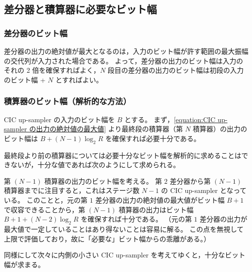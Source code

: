     \subsection{差分器と積算器に必要なビット幅}
        \subsubsection{差分器のビット幅}
            差分器の出力の絶対値が最大となるのは，入力のビット幅が許す範囲の最大振幅の交代列が入力された場合である。
            よって，差分器の出力のビット幅は入力のそれの 2 倍を確保すればよく，$N$ 段目の差分器の出力のビット幅は初段の入力のビット幅 + $N$ とすればよい。
        \subsubsection{積算器のビット幅（解析的な方法）}
            CIC up-sampler の入力のビット幅を $B$ とする。
            まず，\cref{equation:CIC up-sampler の出力の絶対値の最大値} より最終段の積算器（第 $N$ 積算器）の出力のビット幅は $B + (N-1)\log_2 R$ を確保すれば必要十分である。
            \par
            最終段より前の積算器については必要十分なビット幅を解析的に求めることはできないが，十分な値であれば次のようにして求められる。
            \par
            第 $(N-1)$ 積算器の出力のビット幅を考える。
            第 $2$ 差分器から第 $(N-1)$ 積算器までに注目すると，これはステージ数 $N-1$ の CIC up-sampler となっている。
            このことと，元の第 $1$ 差分器の出力の絶対値の最大値がビット幅 $B+1$ で収容できることから，第 $(N-1)$ 積算器の出力はビット幅 $B + 1 + (N-2)\log_2 R$ を確保すれば十分である。
            （元の第 $1$ 差分器の出力が最大値で一定していることはあり得ないことは容易に解る。
            この点を無視して上限で評価しており，故に「必要な」ビット幅からの乖離がある。）
            \par
            同様にして次々に内側の小さい CIC up-sampler を考えてゆくと，十分なビット幅が求まる。
